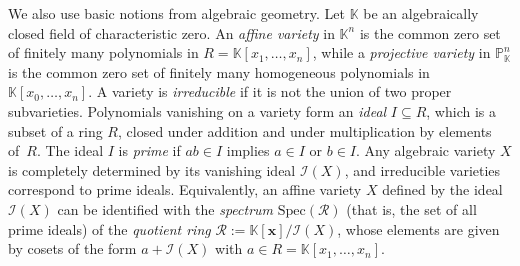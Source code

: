 \documentclass[12pt,a4paper]{extarticle}
\theoremstyle{definition}
\newcommand{\K}{\mathbb{K}}
\begin{document}
\medskip

We also use basic notions from algebraic geometry. Let $\mathbb{K}$ be an
algebraically closed field of characteristic zero. An \emph{affine variety} in
$\mathbb{K}^n$ is the common zero set of finitely many polynomials in
$R = \mathbb{K}[x_1,\ldots,x_n]$, while a \emph{projective variety} in
$\mathbb{P}_{\mathbb{K}}^n$ is the common zero set of finitely many
homogeneous polynomials in $\mathbb{K}[x_0,\ldots,x_n]$. A variety is
\emph{irreducible} if it is not the union of two proper subvarieties.
Polynomials vanishing on a variety form an
\emph{ideal} $I \subseteq R$, which is a subset of a ring $R$, closed under addition and
under multiplication by elements of~$R$. The ideal $I$ is \emph{prime} if $ab\in I$
implies $a\in I$ or $b\in I$. Any algebraic variety $X$ is completely
determined by its vanishing ideal $\mathcal{I}(X)$, and irreducible varieties correspond to prime ideals. 
Equivalently, an affine variety $X$ defined by the ideal $\mathcal{I}(X)$ can be identified with the \emph{spectrum}  $\mathrm{Spec}(\mathcal{R})$ (that is, the set of all prime ideals) of the \emph{quotient ring} $\mathcal{R}:=\mathbb{K}[\mathbf{x}]/\mathcal{I}(X)$, whose elements are given by cosets of the form $a + \mathcal{I}(X)$ with $a \in R=\K[x_1,\dots,x_n]$.

\medskip
\end{document}
